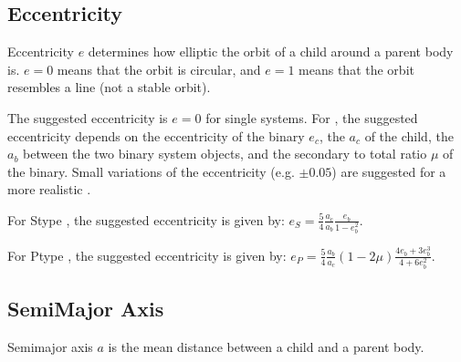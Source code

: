 \documentclass[letterpaper,10pt,english]{sphinxmanual}
\begin{document}
\subsection{Eccentricity}
\label{\detokenize{quantities/orbital/eccentricity:eccentricity}}\label{\detokenize{quantities/orbital/eccentricity::doc}}\label{\detokenize{quantities/orbital/eccentricity:id1}}
\sphinxAtStartPar
Eccentricity \(e\) determines how elliptic the orbit of a child around a parent body is.
\(e = 0\) means that the orbit is circular, and \(e = 1\) means
that the orbit resembles a line (not a stable orbit).

\sphinxAtStartPar
The suggested eccentricity is \(e = 0\) for single {\hyperref[\detokenize{celestial_bodies/star:id1}]{}} systems.
For {\hyperref[\detokenize{celestial_systems/binary_system:id1}]{}}, the suggested eccentricity depends on the
eccentricity of the binary \(e_c\),
the {\hyperref[\detokenize{quantities/orbital/semi_major_axis:id1}]{}} \(a_c\) of the child, the
{\hyperref[\detokenize{quantities/orbital/semi_major_axis:id1}]{}} \(a_b\) between the two binary system objects,
and the secondary to total {\hyperref[\detokenize{quantities/material/mass:id1}]{}} ratio \(\mu\) of the binary. Small
variations of the eccentricity (e.g. \(\pm 0.05\)) are suggested for a more realistic
{\hyperref[\detokenize{quantities/orbital/orbital:id1}]{}}.

\sphinxAtStartPar
For S\sphinxhyphen{}type {\hyperref[\detokenize{celestial_systems/binary_system:id1}]{}}, the suggested eccentricity is given by:
\(e_S = \frac{5}{4} \frac{a_c}{a_b} \frac{e_b}{1-e_b^2}\).

\sphinxAtStartPar
For P\sphinxhyphen{}type {\hyperref[\detokenize{celestial_systems/binary_system:id1}]{}}, the suggested eccentricity is given by:
\(e_P = \frac{5}{4} \frac{a_b}{a_c} (1-2\mu) \frac{4 e_b + 3e_b^3}{4 + 6e_b^2}\).


\subsection{Semi\sphinxhyphen{}Major Axis}
\label{\detokenize{quantities/orbital/semi_major_axis:semi-major-axis}}\label{\detokenize{quantities/orbital/semi_major_axis::doc}}\label{\detokenize{quantities/orbital/semi_major_axis:id1}}
\sphinxAtStartPar
Semi\sphinxhyphen{}major axis \(a\) is the mean distance between a child and a parent body.
\end{document}
